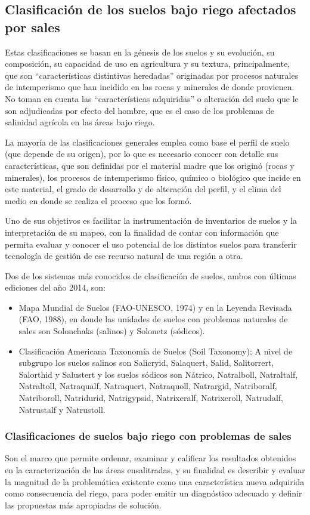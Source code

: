 \subsection{Clasificación de los suelos bajo riego afectados por sales}
Estas clasificaciones se basan en la génesis de los suelos y su evolución, su composición, su capacidad de uso en agricultura y su textura, principalmente, que son ``características distintivas heredadas'' originadas por procesos naturales de intemperismo que han incidido en las rocas y minerales de donde provienen. No toman en cuenta las ``características adquiridas'' o alteración del suelo que le son adjudicadas por efecto del hombre, que es el caso de los problemas de salinidad agrícola en las áreas bajo riego.

La mayoría de las clasificaciones generales emplea como base el perfil de suelo (que depende de su origen), por lo que es necesario conocer con detalle sus características, que son definidas por el material madre que los originó (rocas y minerales), los procesos de intemperismo físico, químico o biológico que incide en este material, el grado de desarrollo y de alteración del perfil, y el clima del medio en donde se realiza el proceso que los formó.

Uno de sus objetivos es facilitar la instrumentación de inventarios de suelos y la interpretación de su mapeo, con la finalidad de contar con información que permita evaluar y conocer el uso potencial de los distintos suelos para transferir tecnología de gestión de ese recurso natural de una región a otra.

Dos de los sistemas más conocidos de clasificación de suelos, ambos con últimas ediciones del año 2014, son:
\begin{itemize}
  \item Mapa Mundial de Suelos (FAO-UNESCO, 1974) y en la Leyenda Revisada (FAO, 1988), en donde las unidades de suelos con problemas naturales de sales son Solonchaks (salinos) y Solonetz (sódicos).
  \item Clasificación Americana Taxonomía de Suelos (Soil Taxonomy); A nivel de subgrupo los suelos salinos son Salicryid, Salaquert, Salid, Salitorrert, Salorthid y Salustert y los suelos sódicos son Nátrico, Natralboll, Natraltalf, Natraltoll, Natraqualf, Natraquert, Natraquoll, Natrargid, Natriboralf, Natriboroll, Natridurid, Natrigypsid, Natrixeralf, Natrixeroll, Natrudalf, Natrustalf y Natrustoll.
\end{itemize}
\subsubsection{Clasificaciones de suelos bajo riego con problemas de sales}
Son el marco que permite ordenar, examinar y calificar los resultados obtenidos en la caracterización de las áreas ensalitradas, y su finalidad es describir y evaluar la magnitud de la problemática existente como una característica nueva adquirida como consecuencia del riego, para poder emitir un diagnóstico adecuado y definir las propuestas más apropiadas de solución.

